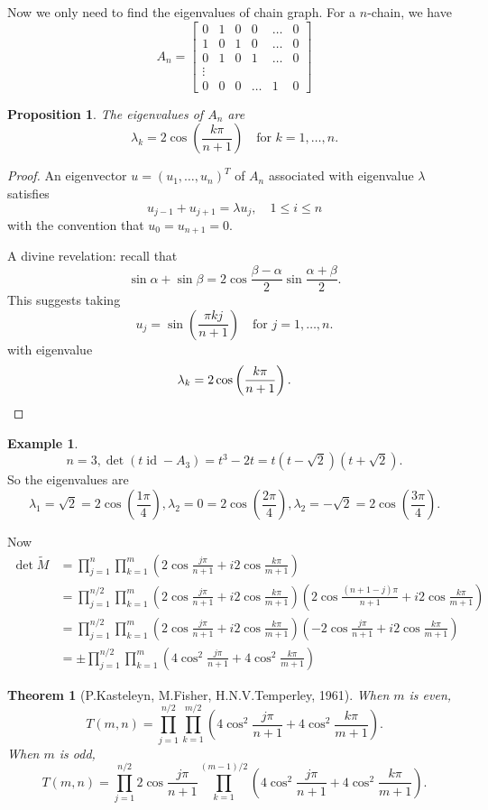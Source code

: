 \documentclass{report}
\def \id {\operatorname{id}}
\newtheorem{theorem}{Theorem}[section]
\newtheorem{proposition}{Proposition}[section]
\theoremstyle{definition}
\newtheorem{example}{Example}[section]
\theoremstyle{remark}
\numberwithin{equation}{section}
\begin{document}
Now we only need to find the eigenvalues of chain graph. For a $n$-chain, we have
\[
A_n = \begin{bmatrix}
0 & 1 & 0 & 0 & \ldots & 0 \\
1 & 0 & 1 & 0 & \ldots & 0 \\
0 & 1 & 0 & 1 & \ldots & 0 \\
\vdots \\
0 & 0 & 0 & \ldots & 1 & 0
\end{bmatrix}
\]
\begin{proposition}
The eigenvalues of $A_n$ are 
\[
\lambda_k = 2 \cos\left(\frac{k\pi}{n+1}\right)\quad \text{for } k = 1, \ldots, n.
\]
\end{proposition}
\begin{proof}
An eigenvector $u = (u_1, \ldots, u_n)^T$ of $A_n$ associated with eigenvalue $\lambda$ satisfies
\[
u_{j-1}+u_{j+1} = \lambda u_j, \quad 1 \leq i \leq n
\]
with the convention that $u_0 = u_{n+1} = 0$.


A divine revelation:
recall that \[\sin\alpha + \sin\beta = 2\cos\frac{\beta - \alpha}{2}\sin\frac{\alpha+\beta}{2}.\]
This suggests taking
\[
u_j = \sin\left(\frac{\pi k j}{n + 1}\right) \quad \text{for } j = 1, \ldots, n.
\]
with eigenvalue 
\[
\lambda_k = 2 \cos\left(\frac{k\pi}{n+1}\right). \qedhere
\]
\end{proof}
\begin{example}
\[n = 3, \det(t\id - A_3) = t^3 - 2t = t(t - \sqrt{2})(t + \sqrt{2}).\]
So the eigenvalues are 
\[
\lambda_1 = \sqrt{2} = 2\cos\left(\frac{1\pi}{4}\right), \lambda_2 = 0 = 2\cos\left(\frac{2\pi}{4}\right), \lambda_2 = -\sqrt{2} = 2\cos\left(\frac{3\pi}{4}\right).
\]
\end{example}
Now
\begin{align*}
\det\tilde{M} & = \prod_{j=1}^n\prod_{k=1}^m \left(2\cos\frac{j\pi}{n+1} + i2\cos\frac{k\pi}{m+1}\right) \\ & = \prod_{j=1}^{n/2}\prod_{k=1}^m \left(2\cos\frac{j\pi}{n+1} + i2\cos\frac{k\pi}{m+1}\right)\left(2\cos\frac{(n+1-j)\pi}{n+1} + i2\cos\frac{k\pi}{m+1}\right) \\
& = \prod_{j=1}^{n/2}\prod_{k=1}^m \left(2\cos\frac{j\pi}{n+1} + i2\cos\frac{k\pi}{m+1}\right)\left(-2\cos\frac{j\pi}{n+1} + i2\cos\frac{k\pi}{m+1}\right) \\
& = \pm\prod_{j=1}^{n/2}\prod_{k=1}^m \left(4\cos^2\frac{j\pi}{n+1} + 4\cos^2\frac{k\pi}{m+1}\right)
\end{align*}

\begin{theorem}[P.Kasteleyn, M.Fisher, H.N.V.Temperley, 1961]
When $m$ is even,
\[
T(m, n) = \prod_{j=1}^{n/2}\prod_{k=1}^{m/2} \left(4\cos^2\frac{j\pi}{n+1} + 4\cos^2\frac{k\pi}{m+1}\right).
\]
When $m$ is odd,
\[
T(m, n) = \prod_{j=1}^{n/2}2\cos\frac{j\pi}{n+1}\prod_{k=1}^{(m-1)/2} \left(4\cos^2\frac{j\pi}{n+1} + 4\cos^2\frac{k\pi}{m+1}\right).
\]
\end{theorem}
\end{document}
